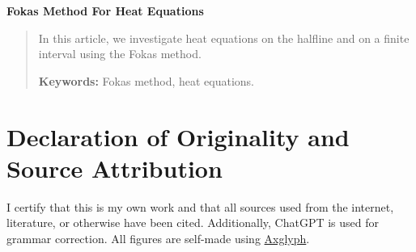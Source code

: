 \documentclass[12pt]{article}
\numberwithin{equation}{section}
\renewcommand{\maketitle}{%
    \centerline{\LARGE{\textbf{Fokas Method For Heat Equations}}}
}
\begin{document}
\vspace{1cm}
\maketitle
\vspace{1mm} %
\begin{abstract}
    \large{In this article, we investigate heat equations on the halfline and on a finite interval using the Fokas method.}
    \bigskip
    
    \noindent\textbf{Keywords:}
    Fokas method, heat equations.
\end{abstract}
\tableofcontents
{}
\fancyhf{} 
\thispagestyle{firstpagestyle}
\newpage
\section*{Declaration of Originality and Source Attribution}
I certify that this is my own work and that all sources used from the internet, literature, or otherwise have been cited. Additionally, ChatGPT is used for grammar correction. All figures are self-made using \href{https://www.amyxun.com/}{Axglyph}.
\end{document}
